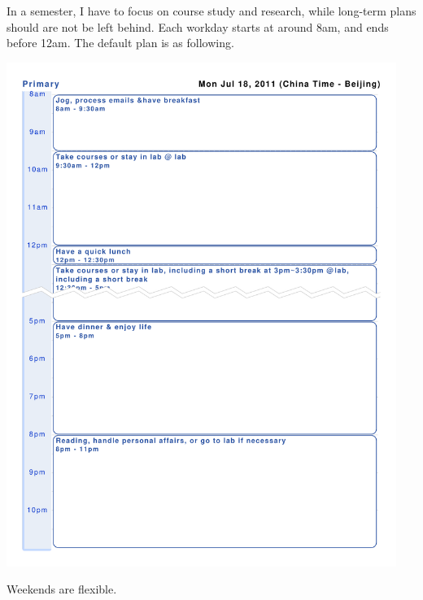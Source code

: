 In a semester, I have to focus on course study and research, while long-term plans should are not be left behind. Each workday starts at around 8am, and ends before 12am. The default plan is as following.

\includegraphics[width=0.95\textwidth]{figure/workday_semester.pdf}

Weekends are flexible.
